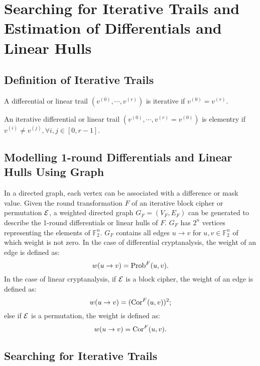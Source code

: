 \section{Searching for Iterative Trails and Estimation of Differentials and Linear Hulls\label{sec:method}}

\subsection{Definition of Iterative Trails}

\begin{definition}
	A differential or linear trail $(v^{(0)},\cdots,v^{(r)})$ is iterative if $v^{(0)}=v^{(r)}$.
\end{definition}

\begin{definition}
    An iterative differential or linear trail $(v^{(0)},\cdots,v^{(r)}=v^{(0)})$ is elementry if $v^{(i)}\neq v^{(j)},\forall i,j\in [0,r-1]$.
\end{definition}

\subsection{Modelling 1-round Differentials and Linear Hulls Using Graph}

In a directed graph, each vertex can be associated with a difference or mask value. Given the round transformation $F$ of an iterative block cipher or permutation $\mathcal{E}$, a weighted directed graph $G_{F}=(V_{F},E_{F})$ can be generated to describe the 1-round differentials or linear hulls of $F$. $G_{F}$ has $2^n$ vertices representing the elements of $\mathbb{F}_2^n$. $G_{F}$ contains all edges $u\rightarrow v$ for $u,v\in \mathbb{F}_2^n$ of which weight is not zero. In the case of differential cryptanalysis, the weight of an edge is defined as:
\[
    w(u\rightarrow v)=\text{Prob}^{F}(u,v).
\]
In the case of linear cryptanalysis, if $\mathcal{E}$ is a block cipher, the weight of an edge is defined as:
\[
    w(u\rightarrow v)=(\text{Cor}^{F}(u,v))^2;
\]
else if $\mathcal{E}$ is a permutation, the weight is defined as:
\[
    w(u\rightarrow v)=\text{Cor}^{F}(u,v).
\]

\subsection{Searching for Iterative Trails\label{subsec:iterative-trails}}

